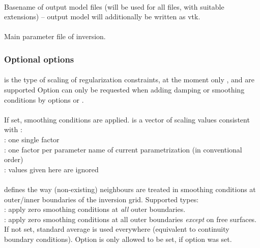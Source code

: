 \paragraph{}
Basename of output model files (will be used for all files, with suitable extensions) -- output model will additionally be written as vtk.
\paragraph{}
Main parameter file of inversion.
\subsubsection{Optional options}
\paragraph{}
 is the type of scaling of regularization constraints, at the moment only 
,  and  are supported
Option  can only be requested when adding damping or smoothing conditions by options 
 or .
\paragraph{}
If set, smoothing conditions are applied.  is a vector of scaling values consistent 
with :\\
: one single factor\\
: one factor per parameter name of current parametrization (in conventional order)\\
 : values given here are ignored
\paragraph{}
 defines the way (non-existing) neighbours are treated in smoothing conditions at outer/inner 
boundaries of the inversion grid. Supported types:\\
: apply zero smoothing conditions at \emph{all} outer boundaries.\\
: apply zero smoothing conditions at all outer boundaries \emph{except} on free surfaces. \\
If not set, standard average is used everywhere (equivalent to continuity boundary conditions).
Option  is only allowed to be set, if option  was set.

